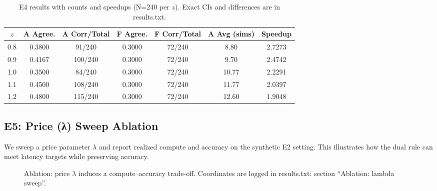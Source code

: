 \begin{table}[H]
  \centering
  \caption{E4 results with counts and speedups (N=240 per $z$). Exact CIs and differences are in results.txt.}
  \vspace{0.25em}
  \begin{adjustbox}{width=\linewidth}
  \begin{tabular}{c c c c c c c}
    \toprule
    $z$ & A Agree. & A Corr/Total & F Agree. & F Corr/Total & A Avg (sims) & Speedup \\
    \midrule
    0.8 & 0.3800 & 91/240  & 0.3000 & 72/240 & 8.80  & 2.7273 \\
    0.9 & 0.4167 & 100/240 & 0.3000 & 72/240 & 9.70  & 2.4742 \\
    1.0 & 0.3500 & 84/240  & 0.3000 & 72/240 & 10.77 & 2.2291 \\
    1.1 & 0.4500 & 108/240 & 0.3000 & 72/240 & 11.77 & 2.0397 \\
    1.2 & 0.4800 & 115/240 & 0.3000 & 72/240 & 12.60 & 1.9048 \\
    \bottomrule
  \end{tabular}
  \end{adjustbox}
\end{table}

\subsection{E5: Price (λ) Sweep Ablation}
We sweep a price parameter $\lambda$ and report realized compute and accuracy on the synthetic E2 setting. This illustrates how the dual rule can meet latency targets while preserving accuracy.
\begin{figure}[H]
  \centering
  \begin{adjustbox}{width=\linewidth}
  \end{adjustbox}
  \caption{Ablation: price $\lambda$ induces a compute--accuracy trade-off. Coordinates are logged in results.txt: section ``Ablation: lambda sweep''.}
  \label{fig:ablation}
\end{figure}

